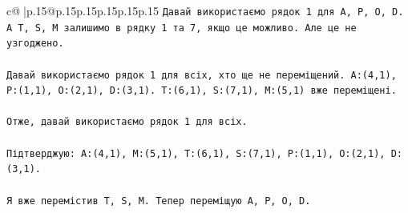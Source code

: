 \documentclass{article}
\begin{document}
{\begin{supertabular}{c@{$\;$}|p{.15\linewidth}@{}p{.15\linewidth}p{.15\linewidth}p{.15\linewidth}p{.15\linewidth}p{.15\linewidth}}
{{{\texttt{Давай використаємо рядок 1 для A, P, O, D. А T, S, M залишимо в рядку 1 та 7, якщо це можливо. Але це не узгоджено. } \\
\\ 
\texttt{Давай використаємо рядок 1 для всіх, хто ще не переміщений. A:(4,1), P:(1,1), O:(2,1), D:(3,1). T:(6,1), S:(7,1), M:(5,1) вже переміщені. } \\
\\ 
\texttt{Отже, давай використаємо рядок 1 для всіх. } \\
\\ 
\texttt{Підтверджую: A:(4,1), M:(5,1), T:(6,1), S:(7,1), P:(1,1), O:(2,1), D:(3,1). } \\
\\ 
\texttt{Я вже перемістив T, S, M. Тепер переміщую A, P, O, D.} \\
            }
        }
    }
     \\ \\


\end{supertabular}}
\end{document}
